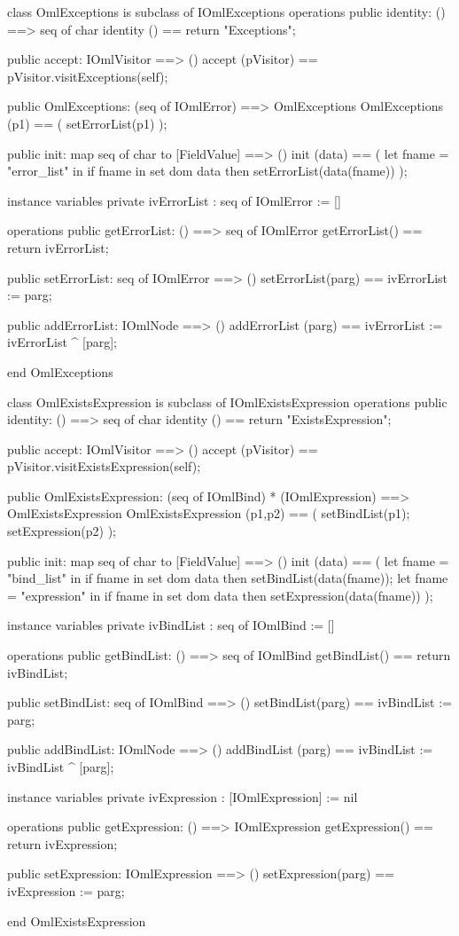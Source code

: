\begin{vdm_al}
class OmlExceptions is subclass of IOmlExceptions
operations
  public identity: () ==> seq of char
  identity () == return "Exceptions";

  public accept: IOmlVisitor ==> ()
  accept (pVisitor) == pVisitor.visitExceptions(self);

  public OmlExceptions:
      (seq of IOmlError) ==> OmlExceptions
  OmlExceptions (p1) == 
   ( setErrorList(p1) );

  public init: map seq of char to [FieldValue] ==> ()
  init (data) ==
    ( let fname = "error_list" in
        if fname in set dom data
        then setErrorList(data(fname)) );

instance variables
  private ivErrorList : seq of IOmlError := []

operations
  public getErrorList: () ==> seq of IOmlError
  getErrorList() == return ivErrorList;

  public setErrorList: seq of IOmlError ==> ()
  setErrorList(parg) == ivErrorList := parg;

  public addErrorList: IOmlNode ==> ()
  addErrorList (parg) == ivErrorList := ivErrorList ^ [parg];

end OmlExceptions
\end{vdm_al}

\begin{vdm_al}
class OmlExistsExpression is subclass of IOmlExistsExpression
operations
  public identity: () ==> seq of char
  identity () == return "ExistsExpression";

  public accept: IOmlVisitor ==> ()
  accept (pVisitor) == pVisitor.visitExistsExpression(self);

  public OmlExistsExpression:
      (seq of IOmlBind) *
      (IOmlExpression) ==> OmlExistsExpression
  OmlExistsExpression (p1,p2) == 
   ( setBindList(p1);
     setExpression(p2) );

  public init: map seq of char to [FieldValue] ==> ()
  init (data) ==
    ( let fname = "bind_list" in
        if fname in set dom data
        then setBindList(data(fname));
      let fname = "expression" in
        if fname in set dom data
        then setExpression(data(fname)) );

instance variables
  private ivBindList : seq of IOmlBind := []

operations
  public getBindList: () ==> seq of IOmlBind
  getBindList() == return ivBindList;

  public setBindList: seq of IOmlBind ==> ()
  setBindList(parg) == ivBindList := parg;

  public addBindList: IOmlNode ==> ()
  addBindList (parg) == ivBindList := ivBindList ^ [parg];

instance variables
  private ivExpression : [IOmlExpression] := nil

operations
  public getExpression: () ==> IOmlExpression
  getExpression() == return ivExpression;

  public setExpression: IOmlExpression ==> ()
  setExpression(parg) == ivExpression := parg;

end OmlExistsExpression
\end{vdm_al}

